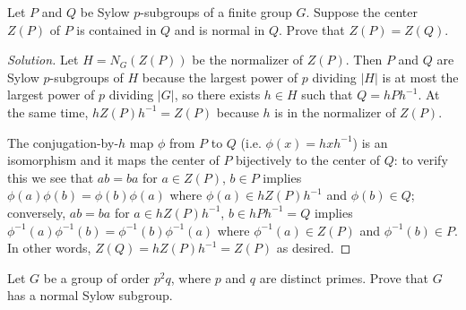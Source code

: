 \documentclass[10pt]{article}
\providecommand{\inv}{^{-1}}
\newenvironment{soln}{\begin{proof}[Solution]}{\end{proof}}
\providecommand{\abs}[1]{\left|#1\right|}
\begin{document}
\begin{problem}
    Let $P$ and $Q$ be Sylow $p$-subgroups of a finite group $G$.
    Suppose the center $Z(P)$ of $P$ is contained in $Q$
    and is normal in $Q$. Prove that $Z(P) = Z(Q)$.
\end{problem}

\begin{soln}
    Let $H = N_G(Z(P))$ be the normalizer of $Z(P)$.
    Then $P$ and $Q$ are Sylow $p$-subgroups of $H$
    because the largest power of $p$ dividing $\abs H$ is at most
    the largest power of $p$ dividing $\abs G$,
    so there exists $h\in H$ such that $Q = hPh\inv$.
    At the same time, $hZ(P)h\inv = Z(P)$ because $h$ is in the normalizer of $Z(P)$.

    The conjugation-by-$h$ map $\phi$ from $P$ to $Q$ (i.e. $\phi(x) = hxh\inv$)
    is an isomorphism and it maps the center of $P$ bijectively to the center of $Q$:
    to verify this we see that $ab = ba$ for $a\in Z(P)$, $b\in P$
    implies $\phi(a)\phi(b) = \phi(b)\phi(a)$ where
    $\phi(a)\in hZ(P)h\inv$ and $\phi(b)\in Q$;
    conversely, $ab = ba$ for $a\in hZ(P)h\inv$, $b\in hPh\inv = Q$ implies
    $\phi\inv(a)\phi\inv(b) = \phi\inv(b)\phi\inv(a)$ where
    $\phi\inv(a)\in Z(P)$ and $\phi\inv(b)\in P$.
    In other words, $Z(Q) = hZ(P)h\inv = Z(P)$ as desired.
\end{soln}

\pagebreak

\begin{problem}
    Let $G$ be a group of order $p^2q$, where $p$ and $q$ are distinct primes.
    Prove that $G$ has a normal Sylow subgroup.
\end{problem}
\end{document}
